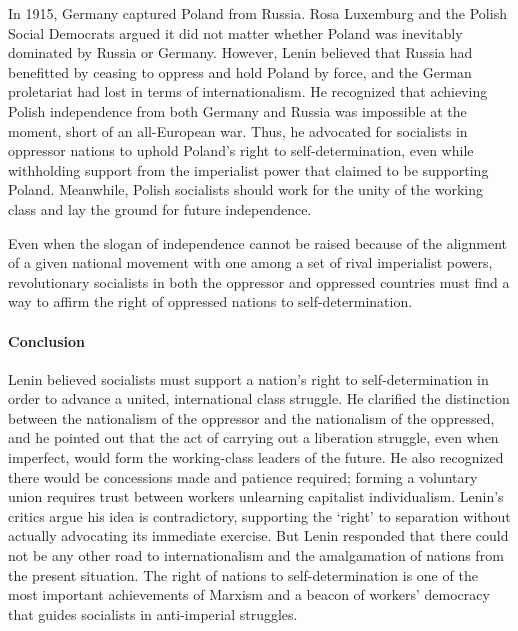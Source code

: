 In 1915, Germany captured Poland from Russia. Rosa Luxemburg and the Polish Social Democrats argued it did not matter whether Poland was inevitably dominated by Russia or Germany. However, Lenin believed that Russia had benefitted by ceasing to oppress and hold Poland by force, and the German proletariat had lost in terms of internationalism. He recognized that achieving Polish independence from both Germany and Russia was impossible at the moment, short of an all-European war. Thus, he advocated for socialists in oppressor nations to uphold Poland's right to self-determination, even while withholding support from the imperialist power that claimed to be supporting Poland. Meanwhile, Polish socialists should work for the unity of the working class and lay the ground for future independence.

Even when the slogan of independence cannot be raised because of the alignment of a given national movement with one among a set of rival imperialist powers, revolutionary socialists in both the oppressor and oppressed countries must find a way to affirm the right of oppressed nations to self-determination.

\paragraph{Conclusion}

Lenin believed socialists must support a nation's right to self-determination in order to advance a united, international class struggle. He clarified the distinction between the nationalism of the oppressor and the nationalism of the oppressed, and he pointed out that the act of carrying out a liberation struggle, even when imperfect, would form the working-class leaders of the future. He also recognized there would be concessions made and patience required; forming a voluntary union requires trust between workers unlearning capitalist individualism. Lenin's critics argue his idea is contradictory, supporting the `right' to separation without actually advocating its immediate exercise. But Lenin responded that there could not be any other road to internationalism and the amalgamation of nations from the present situation. The right of nations to self-determination is one of the most important achievements of Marxism and a beacon of workers' democracy that guides socialists in anti-imperial struggles.
